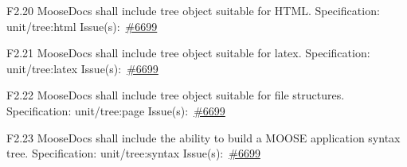 \begin{Requirement}{F2.20}
MooseDocs shall include tree object suitable for HTML.
\newline
Specification: unit/tree:html
\newline
Issue(s):~\href{https://github.com/idaholab/moose/issues/6699}{\#6699}
\end{Requirement}

\begin{Requirement}{F2.21}
MooseDocs shall include tree object suitable for latex.
\newline
Specification: unit/tree:latex
\newline
Issue(s):~\href{https://github.com/idaholab/moose/issues/6699}{\#6699}
\end{Requirement}

\begin{Requirement}{F2.22}
MooseDocs shall include tree object suitable for file structures.
\newline
Specification: unit/tree:page
\newline
Issue(s):~\href{https://github.com/idaholab/moose/issues/6699}{\#6699}
\end{Requirement}

\begin{Requirement}{F2.23}
MooseDocs shall include the ability to build a MOOSE application syntax tree.
\newline
Specification: unit/tree:syntax
\newline
Issue(s):~\href{https://github.com/idaholab/moose/issues/6699}{\#6699}
\end{Requirement}
